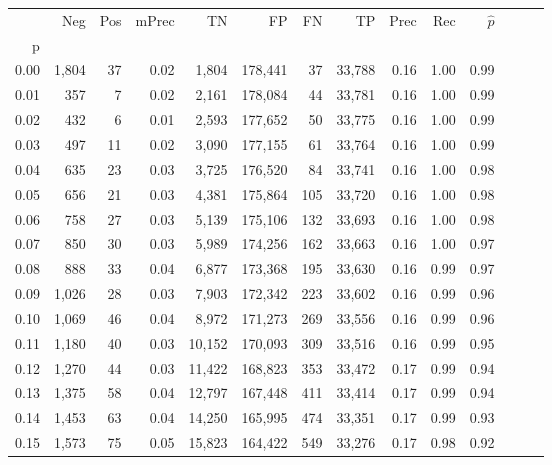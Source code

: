 \begin{tabular}{rrrrrrrrrrrrrr}
\toprule
{} &    Neg &  Pos & mPrec &       TN &       FP &      FN &      TP &  Prec &   Rec & $\hat{p}$ \\
p    &        &      &       &          &          &         &         &       &       &           \\
\midrule
0.00 &  1,804 &   37 &  0.02 &    1,804 &  178,441 &      37 &  33,788 &  0.16 &  1.00 &      0.99 \\
0.01 &    357 &    7 &  0.02 &    2,161 &  178,084 &      44 &  33,781 &  0.16 &  1.00 &      0.99 \\
0.02 &    432 &    6 &  0.01 &    2,593 &  177,652 &      50 &  33,775 &  0.16 &  1.00 &      0.99 \\
0.03 &    497 &   11 &  0.02 &    3,090 &  177,155 &      61 &  33,764 &  0.16 &  1.00 &      0.99 \\
0.04 &    635 &   23 &  0.03 &    3,725 &  176,520 &      84 &  33,741 &  0.16 &  1.00 &      0.98 \\
0.05 &    656 &   21 &  0.03 &    4,381 &  175,864 &     105 &  33,720 &  0.16 &  1.00 &      0.98 \\
0.06 &    758 &   27 &  0.03 &    5,139 &  175,106 &     132 &  33,693 &  0.16 &  1.00 &      0.98 \\
0.07 &    850 &   30 &  0.03 &    5,989 &  174,256 &     162 &  33,663 &  0.16 &  1.00 &      0.97 \\
0.08 &    888 &   33 &  0.04 &    6,877 &  173,368 &     195 &  33,630 &  0.16 &  0.99 &      0.97 \\
0.09 &  1,026 &   28 &  0.03 &    7,903 &  172,342 &     223 &  33,602 &  0.16 &  0.99 &      0.96 \\
0.10 &  1,069 &   46 &  0.04 &    8,972 &  171,273 &     269 &  33,556 &  0.16 &  0.99 &      0.96 \\
0.11 &  1,180 &   40 &  0.03 &   10,152 &  170,093 &     309 &  33,516 &  0.16 &  0.99 &      0.95 \\
0.12 &  1,270 &   44 &  0.03 &   11,422 &  168,823 &     353 &  33,472 &  0.17 &  0.99 &      0.94 \\
0.13 &  1,375 &   58 &  0.04 &   12,797 &  167,448 &     411 &  33,414 &  0.17 &  0.99 &      0.94 \\
0.14 &  1,453 &   63 &  0.04 &   14,250 &  165,995 &     474 &  33,351 &  0.17 &  0.99 &      0.93 \\
0.15 &  1,573 &   75 &  0.05 &   15,823 &  164,422 &     549 &  33,276 &  0.17 &  0.98 &      0.92 \\

\end{tabular}
